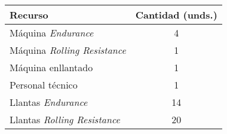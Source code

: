 \documentclass[varwidth=\maxdimen]{standalone}
\begin{document}
\begin{tabular}{ l c }
	\toprule
	Recurso & Cantidad (unds.) \\
	\midrule
	Máquina \textit{Endurance}			& 4 \\
	Máquina \textit{Rolling	Resistance}	& 1 \\
	Máquina enllantado					& 1 \\
	Personal técnico					& 1 \\
	Llantas \textit{Endurance}			& 14 \\
	Llantas \textit{Rolling	Resistance}	& 20 \\
	\bottomrule
\end{tabular}
\end{document}
